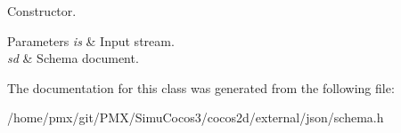 Constructor. 


\begin{DoxyParams}{Parameters}
{\em is} & Input stream. \\
\hline
{\em sd} & Schema document. \\
\hline
\end{DoxyParams}


The documentation for this class was generated from the following file\+:\begin{DoxyCompactItemize}
\item 
/home/pmx/git/\+P\+M\+X/\+Simu\+Cocos3/cocos2d/external/json/schema.\+h\end{DoxyCompactItemize}
